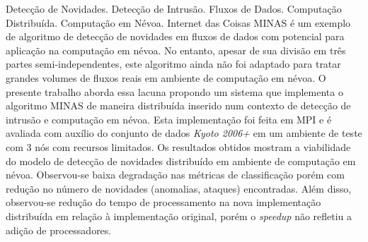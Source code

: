 \begin{resumo}{Detecção de Novidades. Detecção de Intrusão. Fluxos de Dados.
   Computação Distribuída. Computação em Névoa. Internet das Coisas}
   MINAS é um exemplo de algoritmo de detecção de novidades em fluxos de dados
   com potencial para aplicação na computação em névoa.
   No entanto,
   apesar de sua divisão em três partes semi-independentes, este
   algoritmo ainda não foi adaptado para tratar grandes volumes de fluxos
   reais em ambiente de computação em névoa.
   O presente trabalho aborda essa lacuna propondo um sistema que implementa o
   algoritmo MINAS de maneira distribuída inserido num contexto
   de detecção de intrusão e computação em névoa.
   Esta implementação foi feita em MPI e é avaliada com auxílio do conjunto de
   dados \emph{Kyoto 2006+} em um ambiente de teste com 3 nós com recursos
   limitados.
   Os resultados obtidos mostram a viabilidade do modelo de detecção de
   novidades distribuído em ambiente de computação em névoa.
   Observou-se baixa degradação nas métricas de classificação porém com redução
   no número de novidades (anomalias, ataques) encontradas.
   Além disso, observou-se redução do tempo de processamento na nova
   implementação distribuída em relação à implementação original, porém o
   \emph{speedup} não refletiu a adição de processadores.
   

\end{resumo}

